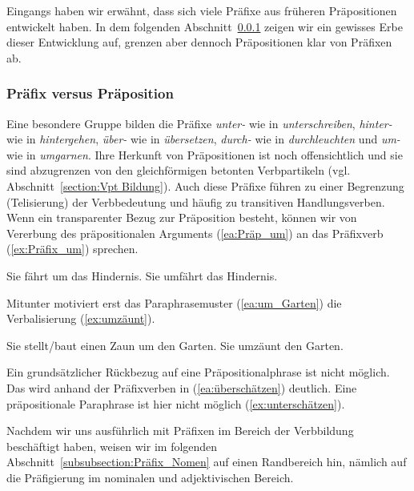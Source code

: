 Eingangs haben wir erwähnt, dass sich viele Präfixe aus früheren Präpositionen entwickelt haben. In dem folgenden Abschnitt~\ref{subsubsection:Präfix_Präposition} zeigen wir ein gewisses Erbe dieser Entwicklung auf, grenzen aber dennoch Präpositionen klar von Präfixen ab.

\subsubsection{Präfix versus Präposition}\label{subsubsection:Präfix_Präposition}

Eine besondere Gruppe bilden die Präfixe \textit{unter-} wie in \textit{unterschreiben}, \textit{hinter-} wie in \textit{hintergehen}, \textit{über-} wie in \textit{übersetzen}, \textit{durch-} wie in \textit{durchleuchten} und \textit{um-} wie in \textit{umgarnen}. Ihre Herkunft von Präpositionen ist noch offensichtlich und sie sind abzugrenzen von den gleichförmigen betonten Verbpartikeln (vgl. Abschnitt~\ref{section:Vpt Bildung}). Auch diese Präfixe führen zu einer Begrenzung (Telisierung) der Verbbedeutung und häufig zu transitiven Handlungsverben. Wenn ein transparenter Bezug zur Präposition besteht, können wir von Vererbung des präpositionalen Arguments (\ref{ea:Präp_um}) an das Präfixverb (\ref{ex:Präfix_um}) sprechen. 


\ea \label{umfahren}
\ea \label{ea:Präp_um} Sie fährt um das Hindernis.
\ex \label{ex:Präfix_um} Sie umfährt das Hindernis.
\z 
\z 

Mitunter motiviert erst das Paraphrasemuster (\ref{ea:um_Garten}) die Verbalisierung (\ref{ex:umzäunt}). 

\ea \label{ea:umzäunen}
\ea \label{ea:um_Garten} Sie stellt/baut einen Zaun um den Garten.
\ex \label{ex:umzäunt} Sie umzäunt den Garten.
\z 
\z 

Ein grundsätzlicher Rückbezug auf eine Präpositionalphrase ist nicht möglich. Das wird anhand der Präfixverben in (\ref{ea:überschätzen}) deutlich. Eine präpositionale Paraphrase ist hier nicht möglich (\ref{ex:unterschätzen}).

\ea \label{ea:Pxschätzen}
\label{ea:überschätzen}
\label{ex:unterschätzen}
\z 
\z 

Nachdem wir uns ausführlich mit Präfixen im Bereich der Verbbildung beschäftigt haben, weisen wir im folgenden Abschnitt~\ref{subsubsection:Präfix_Nomen} auf einen Randbereich hin, nämlich auf die Präfigierung im nominalen und adjektivischen Bereich. 


